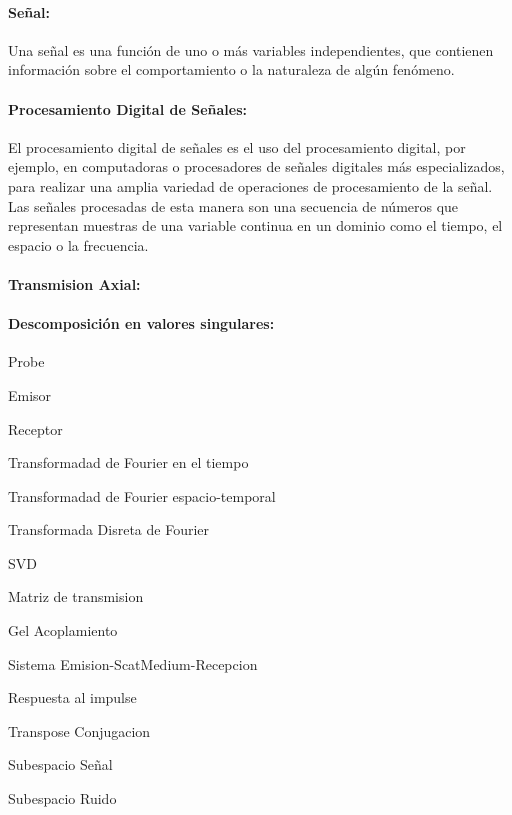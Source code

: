 \paragraph{Señal: } Una señal es una función de uno o más variables independientes, que contienen información sobre el comportamiento o la naturaleza de algún fenómeno.\cite{oppenheim2016signals}


 

\paragraph{Procesamiento Digital de Señales:} El procesamiento digital de señales es el uso del procesamiento digital, por ejemplo, en computadoras o procesadores de señales digitales más especializados, para realizar una amplia variedad de operaciones de procesamiento de la señal. Las señales procesadas de esta manera son una secuencia de números que representan muestras de una variable continua en un dominio como el tiempo, el espacio o la frecuencia.

\paragraph{Transmision Axial: }

\paragraph{Descomposición en valores singulares: }

Probe

Emisor 

Receptor





Transformadad de Fourier en el tiempo

Transformadad de Fourier espacio-temporal

Transformada Disreta de Fourier

SVD 



Matriz de transmision

Gel Acoplamiento

Sistema 
Emision-ScatMedium-Recepcion

Respuesta al impulse

Transpose 
Conjugacion

Subespacio Señal

Subespacio Ruido



